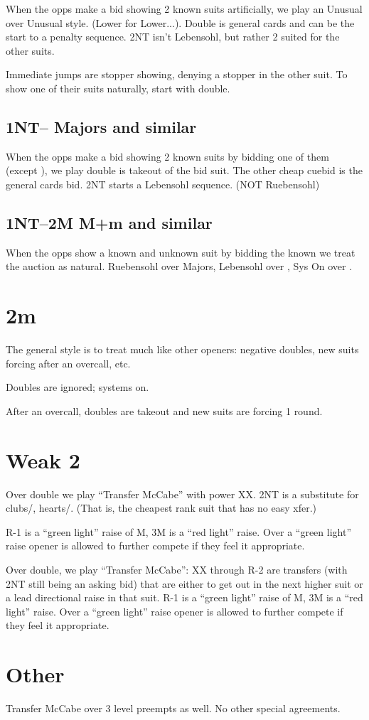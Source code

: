 \documentclass[main]{subfile}
\begin{document}
	When the opps make a bid showing 2 known suits artificially, we play an Unusual over Unusual style. (Lower for Lower...). Double is general cards and can be the start to a penalty sequence. 2NT isn't Lebensohl, but rather 2 suited for the other suits.
	
	Immediate jumps are stopper showing, denying a stopper in the other suit. To show one of their suits naturally, start with double.
	
	\subsection{1NT-- Majors and similar}
	
	When the opps make a bid showing 2 known suits by bidding one of them (except ), we play double is takeout of the bid suit. The other cheap cuebid is the general cards bid. 2NT starts a Lebensohl sequence. (NOT Ruebensohl)
	
	
	\subsection{1NT--2M M+m and similar}
	
	When the opps show a known and unknown suit by bidding the known we treat the auction as natural. Ruebensohl over Majors, Lebensohl over \ddd, Sys On over \ccc.

	{\section[2C]{}}
	{\section{2m}}
	
	The general style is to treat  much like other openers: negative doubles, new suits forcing after an overcall, etc.
	
	Doubles are ignored; systems on.
	
	After an overcall, doubles are takeout and new suits are forcing 1 round.
	
	\section{Weak 2}
	{
	Over double we play ``Transfer McCabe'' with power XX. 2NT is a substitute for clubs/, hearts/. (That is, the cheapest rank suit that has no easy xfer.)
	
	R-1 is a ``green light'' raise of M, 3M is a ``red light'' raise. Over a ``green light'' raise opener is allowed to further compete if they feel it appropriate.
	}
	{
	Over double, we play ``Transfer McCabe'': XX through R-2 are transfers (with 2NT still being an asking bid) that are either to get out in the next higher suit or a lead directional raise in that suit. R-1 is a ``green light'' raise of M, 3M is a ``red light'' raise. Over a ``green light'' raise opener is allowed to further compete if they feel it appropriate.
	}

	\section{Other}
	
	Transfer McCabe over 3 level preempts as well. No other special agreements.
	
\end{document}
